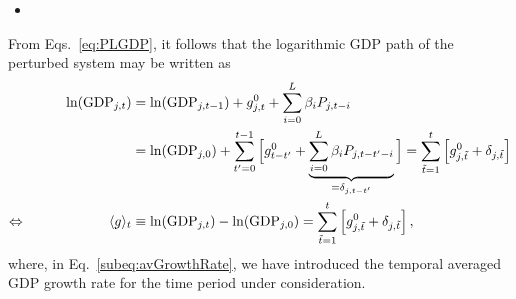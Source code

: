\documentclass[preprint,3p,authoryear]{elsarticle}
\begin{document}
\begin{itemize}
\item {}
\end{itemize}
From Eqs.~\eqref{eq:PLGDP}, it follows that the logarithmic GDP path of the perturbed system may be written as
\begin{subequations}
  \label{eq:GDP}
\begin{align}
  \ln(\operatorname{GDP}_{j,t})&=\ln(\operatorname{GDP}_{j,t-1})+g^{0}_{j,t}+\sum_{i=0}^L\beta_iP_{j,t-i}\notag\\
  &= \ln(\operatorname{GDP}_{j,0})+\sum_{t'=0}^{t-1}\Big[g^{0}_{t-t'}+\underbrace{\sum_{i=0}^L\beta_iP_{j,t-t'-i}}_{=\delta_{j,t-t'}}\Big]=\sum_{\tilde{t}=1}^{t}\left[g^{0}_{j,\tilde{t}}+\delta_{j,\tilde{t}}\right]\notag\\
 \Leftrightarrow\qquad\qquad\qquad \langle g \rangle_t&\equiv\ln(\operatorname{GDP}_{j,t})-\ln(\operatorname{GDP}_{j,0})=\sum_{\tilde{t}=1}^{t}\left[g^{0}_{j,\tilde{t}}+\delta_{j,\tilde{t}}\right]\label{subeq:avGrowthRate},
\end{align}
\end{subequations}
where, in Eq.~\eqref{subeq:avGrowthRate}, we have introduced the temporal averaged GDP growth rate for the time period under consideration.
\end{document}
